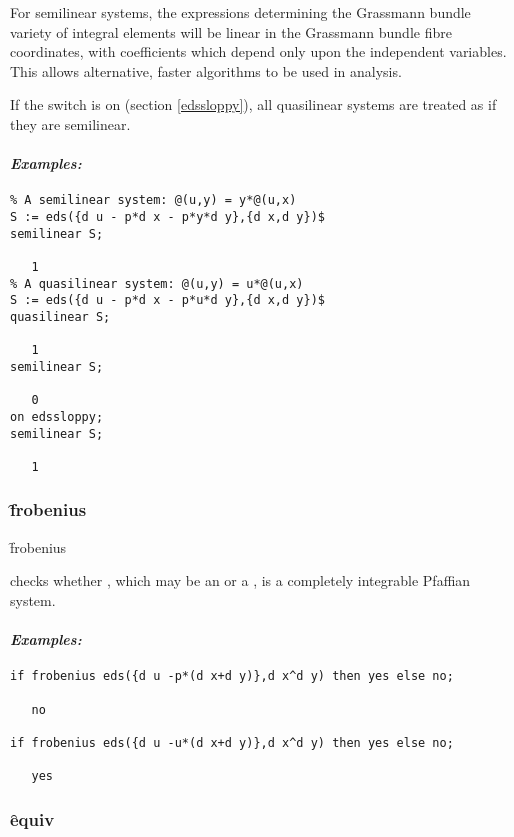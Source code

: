 For semilinear systems, the expressions determining the Grassmann bundle
variety of integral elements will be linear in the Grassmann bundle fibre
coordinates, with coefficients which depend only upon the independent
variables. This allows alternative, faster algorithms to be used in
analysis.

If the switch  is on (section \ref{edssloppy}), all
quasilinear systems are treated as if they are semilinear.

\paragraph{\textit{Examples:}}
\begin{verbatim}
% A semilinear system: @(u,y) = y*@(u,x)
S := eds({d u - p*d x - p*y*d y},{d x,d y})$
semilinear S;

   1
% A quasilinear system: @(u,y) = u*@(u,x)
S := eds({d u - p*d x - p*u*d y},{d x,d y})$
quasilinear S;

   1
semilinear S;

   0
on edssloppy;
semilinear S;

   1
\end{verbatim}

\subsubsection{\f{frobenius}}
\label{frobenius}

\hypertarget{operator:EDS_FROBENIUS}{}
\begin{syntax}
	\f{frobenius} 
\end{syntax}
checks whether , which may be an  or a ,
is a completely integrable Pfaffian system.

\paragraph{\textit{Examples:}}
\begin{verbatim}
if frobenius eds({d u -p*(d x+d y)},d x^d y) then yes else no;

   no

if frobenius eds({d u -u*(d x+d y)},d x^d y) then yes else no;

   yes
\end{verbatim}

\subsubsection{\f{equiv}}
\label{equiv}

